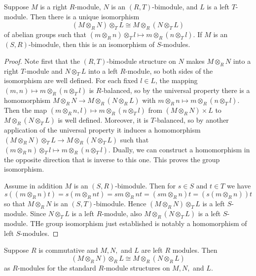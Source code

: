\documentclass[12pt, a4paper, oneside, openright, titlepage]{book}
\begin{document}
\begin{thm}
    Suppose $M$ is a right $R$-module, $N$ is an $(R,T)$-bimodule, and $L$ is a left $T$-module. Then there is a unique isomorphism \begin{equation*}
        (M\otimes_RN)\otimes_TL \cong M\otimes_R(N\otimes_TL)
    \end{equation*}
    of abelian groups such that $(m\otimes_Rn)\otimes_Tl\mapsto m\otimes_R(n\otimes_Tl)$. If $M$ is an $(S,R)$-bimodule, then this is an isomorphism of $S$-modules.
\end{thm}
\begin{proof}
    Note first that the $(R,T)$-bimodule structure on $N$ makes $M\otimes_RN$ into a right $T$-module and $N\otimes_TL$ into a left $R$-module, so both sides of the isomorphism are well defined. For each fixed $l \in L$, the mapping $(m,n)\mapsto m\otimes_R(n\otimes_Tl)$ is $R$-balanced, so by the universal property there is a homomorphism $M\otimes_RN\rightarrow M\otimes_R(N\otimes_RL)$ with $m\otimes_Rn\mapsto m\otimes_R(n\otimes_Tl)$. Then the map $(m\otimes_Rn,l)\mapsto m\otimes_R(n\otimes_Tl)$ from $(M\otimes_RN)\times L$ to $M\otimes_R(N\otimes_TL)$ is well defined. Moreover, it is $T$-balanced, so by another application of the universal property it induces a homomorphism $(M\otimes_RN)\otimes_TL\rightarrow M\otimes_R(N\otimes_TL)$ such that $(m\otimes_Rn)\otimes_Tl \mapsto m\otimes_R(n\otimes_Tl)$. Dually, we can construct a homomorphism in the opposite direction that is inverse to this one. This proves the group isomorphism. 

    Assume in addition $M$ is an $(S,R)$-bimodule. Then for $s \in S$ and $t \in T$ we have \begin{equation*}
        s((m\otimes_Rn)t) = s(m\otimes_Rnt) = sm\otimes_Rnt = (sm\otimes_Rn)t = (s(m\otimes_Rn))t
    \end{equation*}
    so that $M\otimes_RN$ is an $(S,T)$-bimodule. Hence $(M\otimes_RN)\otimes_TL$ is a left $S$-module. Since $N\otimes_TL$ is a left $R$-module, also $M\otimes_R(N\otimes_TL)$ is a left $S$-module. THe group isomorphism just established is notably a homomorphism of left $S$-modules.
\end{proof}

\begin{cor}
    Suppose $R$ is commutative and $M,N,$ and $L$ are left $R$ modules. Then \begin{equation*}
        (M\otimes_RN)\otimes_RL\cong M\otimes_R(N\otimes_RL)
    \end{equation*}
    as $R$-modules for the standard $R$-module structures on $M,N,$ and $L$.
\end{cor}
\end{document}
